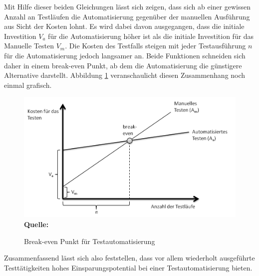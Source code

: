 Mit Hilfe dieser beiden Gleichungen lässt sich zeigen, dass sich ab einer gewissen Anzahl an Testläufen die Automatisierung gegenüber der manuellen Ausführung aus Sicht der Kosten lohnt.
Es wird dabei davon ausgegangen, dass die initiale Investition \(V_a\) für die Automatisierung höher ist als die initiale Investition für das Manuelle Testen \(V_m\).
Die Kosten des Testfalls steigen mit jeder Testausführung \(n\) für die Automatisierung jedoch langsamer an. Beide Funktionen schneiden sich daher in einem break-even Punkt, ab dem die Automatisierung die günstigere Alternative darstellt.
Abbildung \ref{fig:breakEven} veranschaulicht diesen Zusammenhang noch einmal grafisch.

\begin{figure}[htb]
  \centering  
  \includegraphics[scale=0.8]{img/breakeven.png}\\
  \footnotesize\sffamily\textbf{Quelle:} \cite{ramler_economic_2006}
  \caption{Break-even Punkt für Testautomatisierung}
  \label{fig:breakEven}
\end{figure}

Zusammenfassend lässt sich also feststellen, dass vor allem wiederholt ausgeführte Testtätigkeiten hohes Einsparungspotential bei einer Testautomatisierung bieten.


